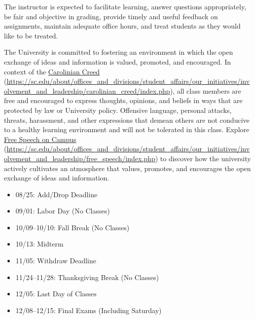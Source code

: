 \documentclass[11pt,letterpaper]{article}
\begin{document}

The instructor is expected to facilitate learning, answer questions appropriately, be fair and objective in grading, provide timely and useful feedback on assignments, maintain adequate office hours, and treat students as they would like to be treated. \pspace




The University is committed to fostering an environment in which the open exchange of ideas and information is valued, promoted, and encouraged.  In context of the \href{https://sc.edu/about/offices\_and\_divisions/student\_affairs/our\_initiatives/involvement\_and\_leadership/carolinian\_creed/index.php}{Carolinian Creed} (\url{https://sc.edu/about/offices\_and\_divisions/student\_affairs/our\_initiatives/involvement\_and\_leadership/carolinian\_creed/index.php}), all class members are free and encouraged to express thoughts, opinions, and beliefs in ways that are protected by law or University policy. Offensive language, personal attacks, threats, harassment, and other expressions that demean others are not conducive to a healthy learning environment and will not be tolerated in this class. Explore \href{https://sc.edu/about/offices\_and\_divisions/student\_affairs/our\_initiatives/involvement\_and\_leadership/free\_speech/index.php}{Free Speech on Campus} (\url{https://sc.edu/about/offices\_and\_divisions/student\_affairs/our\_initiatives/involvement\_and\_leadership/free\_speech/index.php}) to discover how the university actively cultivates an atmosphere that values, promotes, and encourages the open exchange of ideas and information. \sectionbreak




	\begin{itemize}
	\item 08/25: Add/Drop Deadline
	\item 09/01: Labor Day (No Classes)
	\item 10/09--10/10: Fall Break (No Classes)
	\item 10/13: Midterm
	\item 11/05: Withdraw Deadline
	\item 11/24--11/28: Thanksgiving Break (No Classes)
	\item 12/05: Last Day of Classes
	\item 12/08--12/15: Final Exams (Including Saturday)
	\end{itemize}
\end{document}
